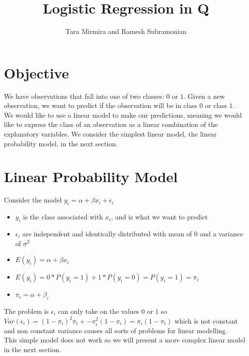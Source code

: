 \documentclass[12pt,timesnewroman,letterpaper]{article}
\begin{document}
\title{Logistic Regression in Q}
\author{ Tara Mirmira and Ramesh Subramonian }
\maketitle
\thispagestyle{fancy}
\cfoot{}
\rfoot{{\small \thepage}}

\section{Objective}

We have observations that fall into one of two classes: $0$ or $1$. Given a new observation, we want to predict if the observation will be in class $0$ or class $1$. \\

\noindent We would like to use a linear model to make our predictions, meaning we would like to express the class of an observation as a linear combination of the explanatory variables. We consider the simplest linear model, the linear probability model, in the next section.

\section{Linear Probability Model}

Consider the model $y_i = \alpha + \beta x_i + \epsilon_i$


\begin{itemize}
    \item $y_i$ is the class associated with $x_i$, and is what we want to predict
    \item $\epsilon_i$ are independent and identically distributed with mean of $0$ and a variance of $\sigma^2$
    \item $E(y_i) = \alpha + \beta x_i$
    \item $E(y_i) = 0 * P(y_i = 1) + 1*P(y_i = 0) = P(y_i = 1) = \pi_i$
    \item $\pi_i = \alpha + \beta_i$
\end{itemize}

\noindent The problem is $\epsilon_i$ can only take on the values $0$ or $1$ so $Var(\epsilon_i) = (1 - \pi_i)^2 \pi_i + -\pi_i^2(1 - \pi_i) = \pi_i(1-\pi_i)$ which is not constant and non constant variance causes all sorts of problems for linear modelling.\\

\noindent This simple model does not work so we will present a more complex linear model in the next section.
\end{document}
